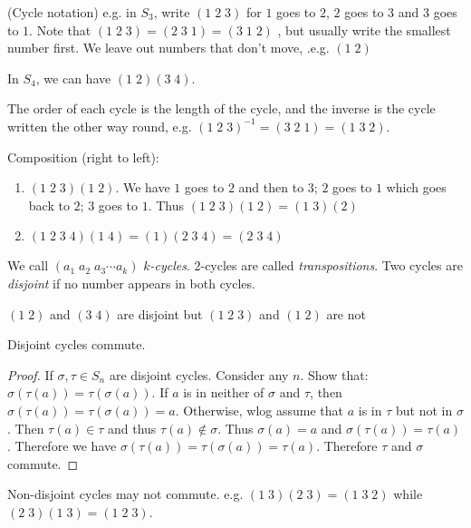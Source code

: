 \documentclass[a4paper]{article}
\begin{document}
  \begin{notation}
    (Cycle notation) e.g. in $S_3$, write $(1\;2\;3)$ for $1$ goes to $2$, $2$ goes to $3$ and $3$ goes to $1$. Note that $(1\; 2\; 3) = (2\; 3\; 1) = (3\; 1\; 2)$ , but usually write the smallest number first. We leave out numbers that don't move, .e.g. $(1\; 2)$

    In $S_4$, we can have $(1\; 2)(3\; 4)$.
  \end{notation}
  \note The order of each cycle is the length of the cycle, and the inverse is the cycle written the other way round, e.g. $(1\; 2\; 3)^{-1} = (3\; 2\; 1) = (1\; 3\; 2)$.

  \begin{eg}
    Composition (right to left):
    \begin{enumerate}
      \item $(1\; 2\; 3)(1\; 2)$. We have $1$ goes to $2$ and then to $3$; $2$ goes to $1$ which goes back to $2$; $3$ goes to $1$. Thus $(1\; 2\; 3)(1\; 2) = (1\;3)(2)$
      \item $(1\; 2\; 3\; 4)(1\; 4) = (1)(2\; 3\; 4) = (2\; 3\; 4)$
    \end{enumerate}
  \end{eg}
  \begin{defi}
    We call $(a_1\; a_2\; a_3\cdots a_k)$ \emph{$k$-cycles}. $2$-cycles are called \emph{transpositions}. Two cycles are \emph{disjoint} if no number appears in both cycles.
  \end{defi}
  \begin{eg}
    $(1\; 2)$ and $(3\; 4)$ are disjoint but $(1\; 2\; 3)$ and $(1\; 2)$ are not
  \end{eg}
  \begin{lemma}
    Disjoint cycles commute.
  \end{lemma}
  \begin{proof}
    If $\sigma, \tau\in S_n$ are disjoint cycles. Consider any $n$. Show that: $\sigma(\tau(a)) = \tau(\sigma(a))$. If $a$ is in neither of $\sigma$ and $\tau$, then $\sigma(\tau(a)) = \tau(\sigma(a)) = a$. Otherwise, wlog assume that $a$ is in $\tau$ but not in $\sigma$. Then $\tau(a)\in \tau$ and thus $\tau(a)\not\in \sigma$. Thus $\sigma(a) = a$ and $\sigma(\tau(a)) = \tau(a)$. Therefore we have $\sigma(\tau(a)) = \tau(\sigma(a)) = \tau(a)$. Therefore $\tau$ and $\sigma$ commute.
  \end{proof}
  \note Non-disjoint cycles may not commute. e.g. $(1\; 3)(2\; 3) = (1\; 3\; 2)$ while $(2\; 3)(1\; 3) = (1\; 2\; 3)$.
\end{document}
